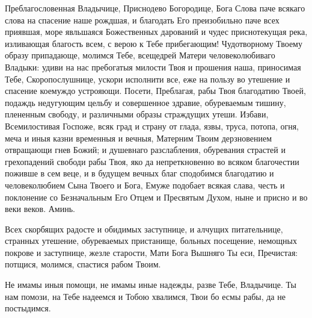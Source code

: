 Преблагословенная Владычице, Приснодево Богородице, Бога Слова паче всякаго слова на спасение наше рождшая, и благодать Его преизобильно паче всех приявшая, море явльшаяся Божественных дарований и чудес приснотекущая река, изливающая благость всем, с верою к Тебе прибегающим! Чудотворному Твоему образу припадающе, молимся Тебе, всещедрей Матери человеколюбиваго Владыки: удиви на нас пребогатыя милости Твоя и прошения наша, приносимая Тебе, Скоропослушнице, ускори исполнити все, еже на пользу во утешение и спасение коемуждо устрояющи. Посети, Преблагая, рабы Твоя благодатию Твоей, подаждь недугующим цельбу и совершенное здравие, обуреваемым тишину, плененным свободу, и различными образы страждущих утеши. Избави, Всемилостивая Госпоже, всяк град и страну от глада, язвы, труса, потопа, огня, меча и иныя казни временныя и вечныя, Матерним Твоим дерзновением отвращающи гнев Божий; и душевнаго разслабления, обуревания страстей и грехопадений свободи рабы Твоя, яко да непреткновенно во всяком благочестии поживше в сем веце, и в будущем вечных благ сподобимся благодатию и человеколюбием Сына Твоего и Бога, Емуже подобает всякая слава, честь и поклонение со Безначальным Его Отцем и Пресвятым Духом, ныне и присно и во веки веков. Аминь.
\mychapterending

 




Всех скорбящих радосте и обидимых заступнице, и алчущих питательнице, странных утешение, обуреваемых пристанище, больных посещение, немощных покрове и заступнице, жезле старости, Мати Бога Вышняго Ты еси, Пречистая: потщися, молимся, спастися рабом Твоим.




Не имамы иныя помощи, не имамы иные надежды, разве Тебе, Владычице. Ты нам помози, на Тебе надеемся и Тобою хвалимся, Твои бо есмы рабы, да не постыдимся.




